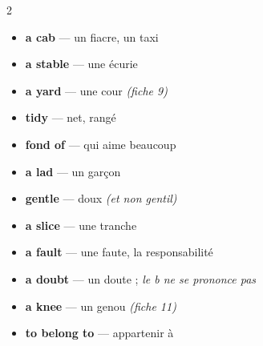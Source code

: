 \documentclass[troisieme]{fiche}
\begin{document}
\begin{multicols}{2}\small
\begin{itemize}[label=--,itemsep=0.8mm,leftmargin=*]
  \item \textbf{a cab} — un fiacre, un taxi
  \item \textbf{a stable} — une écurie
  \item \textbf{a yard} — une cour \textit{(fiche 9)}
  \item \textbf{tidy} — net, rangé
  \item \textbf{fond of} — qui aime beaucoup
  \item \textbf{a lad} — un garçon
  \item \textbf{gentle} — doux \textit{(et non gentil)}
  \item \textbf{a slice} — une tranche
  \item \textbf{a fault} — une faute, la responsabilité
  \item \textbf{a doubt} — un doute ; \textit{le b ne se prononce pas}
  \item \textbf{a knee} — un genou \textit{(fiche 11)}
  \item \textbf{to belong to} — appartenir à
\end{itemize}
\end{multicols}
\end{document}
